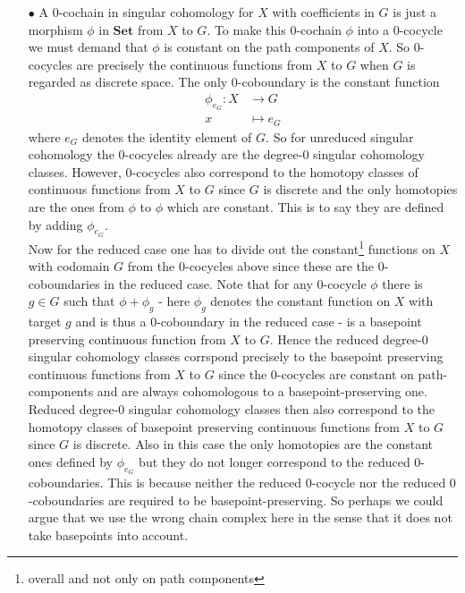 \begin{enumerate}
\item[$\bullet$]
A $0$-cochain in singular cohomology for $X$ with coefficients in $G$ is just a morphism $\phi$ in $\mathbf{Set}$ from $X$ to $G$. To make this $0$-cochain $\phi$ into a $0$-cocycle we must demand that $\phi$ is constant on the path components of $X$. So $0$-cocycles are precisely the continuous functions from $X$ to $G$ when $G$ is regarded as discrete space. The only $0$-coboundary is the constant function
\begin{align*}
  \phi_{e_{G}}
  \colon
  X
  &\rightarrow
  G
  \\
  x
  &\mapsto
  e_{G}
\end{align*}
where $e_{G}$ denotes the identity element of $G$. So for unreduced singular cohomology the $0$-cocycles already are the degree-$0$ singular cohomology classes. However, $0$-cocycles also correspond to the homotopy classes of continuous functions from $X$ to $G$ since $G$ is discrete and the only homotopies are the ones from $\phi$ to $\phi$ which are constant. This is to say they are defined by adding $\phi_{e_{G}}$.
\\
Now for the reduced case one has to divide out the constant\footnote{overall and not only on path components} functions on $X$ with codomain $G$ from the $0$-cocycles above since these are the $0$-coboundaries in the reduced case. Note that for any $0$-cocycle $\phi$ there is $g \in G$ such that $\phi + \phi_{g}$ - here $\phi_{g}$ denotes the constant function on $X$ with target $g$ and is thus a $0$-coboundary in the reduced case - is a basepoint preserving continuous function from $X$ to $G$. Hence the reduced degree-$0$ singular cohomology classes corrspond precisely to the basepoint preserving continuous functions from $X$ to $G$ since the $0$-cocycles are constant on path-components and are always cohomologous to a basepoint-preserving one. Reduced degree-$0$ singular cohomology classes then also correspond to the homotopy classes of basepoint preserving continuous functions from $X$ to $G$ since $G$ is discrete. Also in this case the only homotopies are the constant ones defined by $\phi_{e_{G}}$ but they do not longer correspond to the reduced $0$-coboundaries. This is because neither the reduced $0$-cocycle nor the reduced $0$-coboundaries are required to be basepoint-preserving. So perhaps we could argue that we use the wrong chain complex here in the sense that it does not take basepoints into account.
\end{enumerate}
